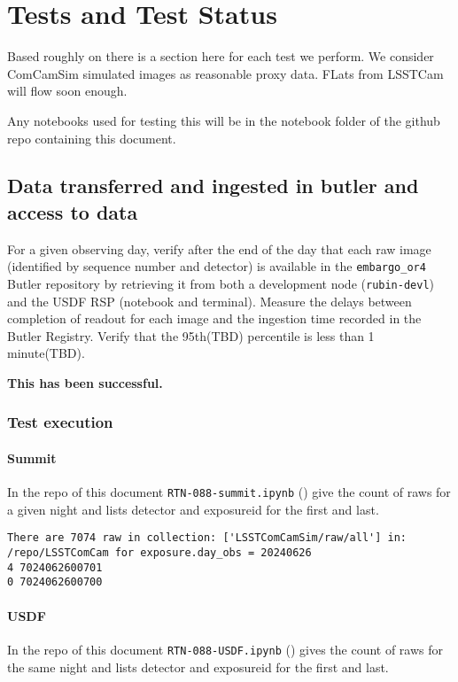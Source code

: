 \section{Tests and Test Status} \label{sec:testing}
Based roughly on  there is a section here for each test we perform.
We consider ComCamSim simulated images as reasonable proxy data.
FLats from LSSTCam will flow soon enough.

Any notebooks used for testing this will be in the notebook folder of the github repo containing this document.

\subsection{Data transferred and ingested in butler and access to data}
For a given observing day, verify after the end of the day that each raw image (identified by sequence number and detector) is available in the \texttt{embargo_or4} Butler repository by retrieving it from both a development node (\texttt{rubin-devl}) and the USDF RSP (notebook and terminal).
Measure the delays between completion of readout for each image and the ingestion time recorded in the Butler Registry.
Verify that the 95th(TBD) percentile is less than 1 minute(TBD).

\textbf{This has been successful.}

\subsubsection{Test execution}
\paragraph{Summit}
In the repo of this document \texttt{RTN-088-summit.ipynb} () give the count of raws for a given night and lists detector and exposureid for the first and last.

\begin{lstlisting}
There are 7074 raw in collection: ['LSSTComCamSim/raw/all'] in: /repo/LSSTComCam for exposure.day_obs = 20240626
4 7024062600701
0 7024062600700
\end{lstlisting}

\paragraph{USDF}
In the repo of this document \texttt{RTN-088-USDF.ipynb} () gives the count of raws for the same night and lists detector and exposureid for the first and last.

